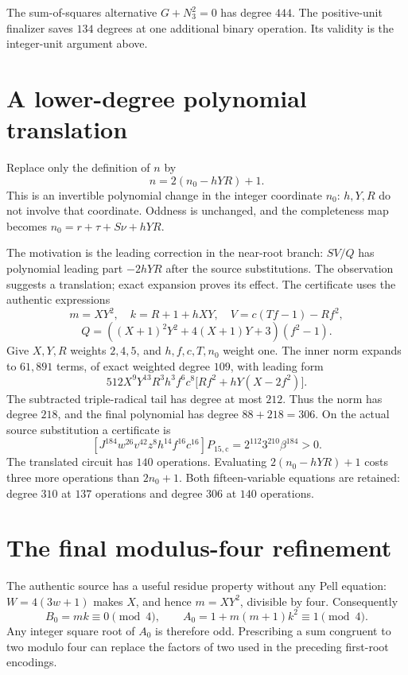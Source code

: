 \documentclass[11pt,letterpaper]{article}
\theoremstyle{remark}\newtheorem{remark}[theorem]{Remark}
\begin{document}
The sum-of-squares alternative $G+N_3^2=0$ has degree $444$.
The positive-unit finalizer saves $134$ degrees at one additional binary
operation. Its validity is the integer-unit argument above.

\section{A lower-degree polynomial translation}\label{sec:centering}
Replace only the definition of $n$ by
\begin{equation}\label{eq:centered-n}n=2(n_0-hYR)+1.\end{equation}
This is an invertible polynomial change in the integer coordinate $n_0$:
$h,Y,R$ do not involve that coordinate. Oddness is unchanged, and the
completeness map becomes
$n_0=r+\tau+S\nu+hYR$.

The motivation is the leading correction in the near-root branch:
$SV/Q$ has polynomial leading part $-2hYR$ after the source substitutions.
The observation suggests a translation; exact expansion proves its effect.
The certificate uses the authentic expressions
\[
 m=XY^2,\quad k=R+1+hXY,\quad V=c(Tf-1)-Rf^2,
\]
\[
 Q=((X+1)^2Y^2+4(X+1)Y+3)(f^2-1).
\]
Give $X,Y,R$ weights $2,4,5$, and $h,f,c,T,n_0$ weight one.
The inner norm expands to $61{,}891$ terms, of exact weighted degree
$109$, with leading form
\[
 512X^9Y^{13}R^3h^3f^6c^8
       \bigl[Rf^2+hY(X-2f^2)\bigr].
\]
The subtracted triple-radical tail has degree at most $212$.
Thus the norm has degree $218$, and the final polynomial has
degree $88+218=306$. On the actual source substitution a certificate is
\[
 [J^{184}w^{26}v^{42}z^8h^{14}f^{16}c^{16}]P_{15,\mathrm c}
   =2^{112}3^{210}\beta^{184}>0.
\]
The translated circuit has $140$ operations. Evaluating
$2(n_0-hYR)+1$ costs three more operations than $2n_0+1$.
Both fifteen-variable equations are retained: degree $310$ at $137$
operations and degree $306$ at $140$ operations.

\section{The final modulus-four refinement}\label{sec:modfour}

The authentic source has a useful residue property without any Pell
equation: $W=4(3w+1)$ makes $X$, and hence $m=XY^2$, divisible by four.
Consequently
\[
 B_0=mk\equiv0\pmod4,\qquad A_0=1+m(m+1)k^2\equiv1\pmod4.
\]
Any integer square root of $A_0$ is therefore odd. Prescribing a sum
congruent to two modulo four can replace the factors of two used in the
preceding first-root encodings.
\end{document}
